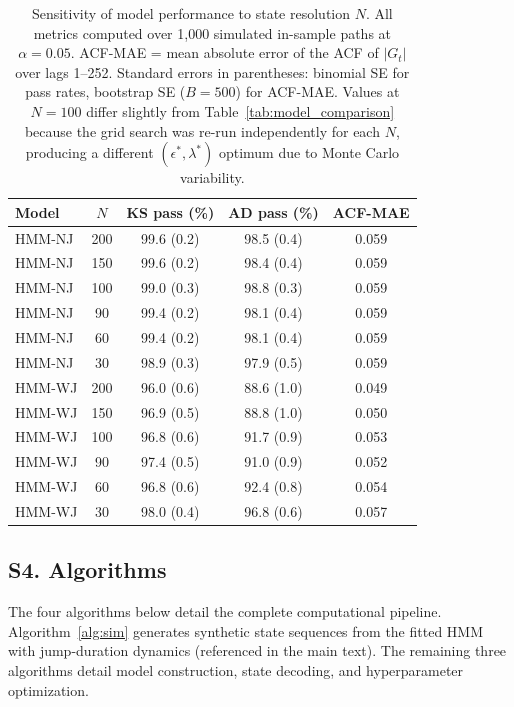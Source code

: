 \begin{table}[tp]
\centering
\caption{Sensitivity of model performance to state resolution $N$.
    All metrics computed over 1{,}000 simulated in-sample paths at $\alpha=0.05$.
    ACF-MAE = mean absolute error of the ACF of $|G_t|$ over lags 1--252.
    Standard errors in parentheses: binomial SE for pass rates,
    bootstrap SE ($B=500$) for ACF-MAE.
    Values at $N=100$ differ slightly from Table~\ref{tab:model_comparison}
    because the grid search was re-run independently for each $N$, producing
    a different $(\epsilon^{*},\lambda^{*})$ optimum due to Monte Carlo variability.}
\label{tab:sensitivity_results}
\begin{tabular}{@{}lcccc@{}}
\toprule
\textbf{Model} & \textbf{$N$} & \textbf{KS pass (\%)} & \textbf{AD pass (\%)} & \textbf{ACF-MAE} \\ \midrule
HMM-NJ & 200 & 99.6 (0.2) & 98.5 (0.4) & 0.059 \\
HMM-NJ & 150 & 99.6 (0.2) & 98.4 (0.4) & 0.059 \\
HMM-NJ & 100 & 99.0 (0.3) & 98.8 (0.3) & 0.059 \\
HMM-NJ &  90 & 99.4 (0.2) & 98.1 (0.4) & 0.059 \\
HMM-NJ &  60 & 99.4 (0.2) & 98.1 (0.4) & 0.059 \\
HMM-NJ &  30 & 98.9 (0.3) & 97.9 (0.5) & 0.059 \\ \midrule
HMM-WJ & 200 & 96.0 (0.6) & 88.6 (1.0) & 0.049 \\
HMM-WJ & 150 & 96.9 (0.5) & 88.8 (1.0) & 0.050 \\
HMM-WJ & 100 & 96.8 (0.6) & 91.7 (0.9) & 0.053 \\
HMM-WJ &  90 & 97.4 (0.5) & 91.0 (0.9) & 0.052 \\
HMM-WJ &  60 & 96.8 (0.6) & 92.4 (0.8) & 0.054 \\
HMM-WJ &  30 & 98.0 (0.4) & 96.8 (0.6) & 0.057 \\ \bottomrule
\end{tabular}
\end{table}

\clearpage

\subsection*{S4. Algorithms}

The four algorithms below detail the complete computational pipeline. Algorithm~\ref{alg:sim} generates synthetic state sequences from the fitted HMM with jump-duration dynamics (referenced in the main text). The remaining three algorithms detail model construction, state decoding, and hyperparameter optimization.

